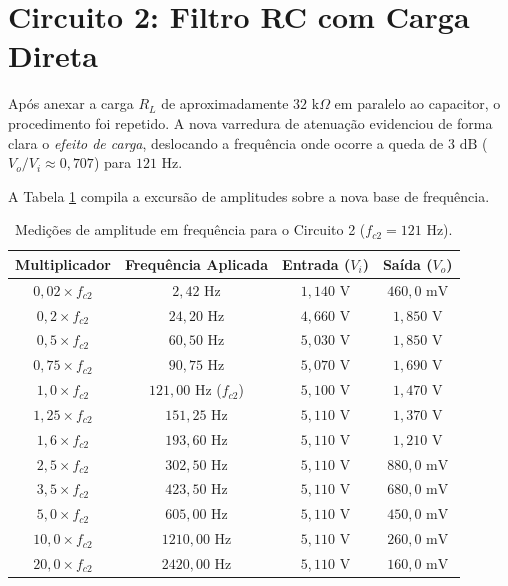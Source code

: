 \section{Circuito 2: Filtro RC com Carga Direta}

Após anexar a carga $R_L$ de aproximadamente $32\text{ k}\Omega$ em paralelo ao capacitor, o procedimento foi repetido. A nova varredura de atenuação evidenciou de forma clara o \textit{efeito de carga}, deslocando a frequência onde ocorre a queda de $3\text{ dB}$ ($V_o/V_i \approx 0,707$) para \textbf{$121\text{ Hz}$}. 

A Tabela \ref{tab:dados_c2} compila a excursão de amplitudes sobre a nova base de frequência.

\begin{table}[H]
	\centering
	\caption{Medições de amplitude em frequência para o Circuito 2 ($f_{c2} = 121\text{ Hz}$).}
	\label{tab:dados_c2}
	\renewcommand{\arraystretch}{1.2}
	\begin{tabular}{cccc}
		\hline
		\textbf{Multiplicador} & \textbf{Frequência Aplicada} & \textbf{Entrada ($V_i$)} & \textbf{Saída ($V_o$)} \\ \hline
		$0,02 \times f_{c2}$ & $2,42\text{ Hz}$ & $1,140\text{ V}$ & $460,0\text{ mV}$ \\
		$0,2 \times f_{c2}$ & $24,20\text{ Hz}$ & $4,660\text{ V}$ & $1,850\text{ V}$ \\
		$0,5 \times f_{c2}$ & $60,50\text{ Hz}$ & $5,030\text{ V}$ & $1,850\text{ V}$ \\
		$0,75 \times f_{c2}$ & $90,75\text{ Hz}$ & $5,070\text{ V}$ & $1,690\text{ V}$ \\
		$1,0 \times f_{c2}$ & $121,00\text{ Hz}$ ($f_{c2}$) & $5,100\text{ V}$ & $1,470\text{ V}$ \\
		$1,25 \times f_{c2}$ & $151,25\text{ Hz}$ & $5,110\text{ V}$ & $1,370\text{ V}$ \\
		$1,6 \times f_{c2}$ & $193,60\text{ Hz}$ & $5,110\text{ V}$ & $1,210\text{ V}$ \\
		$2,5 \times f_{c2}$ & $302,50\text{ Hz}$ & $5,110\text{ V}$ & $880,0\text{ mV}$ \\
		$3,5 \times f_{c2}$ & $423,50\text{ Hz}$ & $5,110\text{ V}$ & $680,0\text{ mV}$ \\
		$5,0 \times f_{c2}$ & $605,00\text{ Hz}$ & $5,110\text{ V}$ & $450,0\text{ mV}$ \\
		$10,0 \times f_{c2}$ & $1210,00\text{ Hz}$ & $5,110\text{ V}$ & $260,0\text{ mV}$ \\
		$20,0 \times f_{c2}$ & $2420,00\text{ Hz}$ & $5,110\text{ V}$ & $160,0\text{ mV}$ \\ \hline
	\end{tabular}
\end{table}

